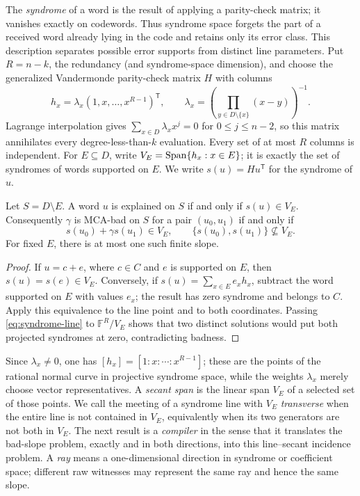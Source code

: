 \documentclass[11pt,a4paper]{amsart}
\numberwithin{equation}{section}
\theoremstyle{remark}
\newcommand{\F}{\mathbb F}\newcommand{\B}{\mathbb B}\newcommand{\K}{\mathbb K}\newcommand{\Z}{\mathbb Z}
\begin{document}
The \emph{syndrome} of a word is the result of applying a parity-check
matrix; it vanishes exactly on codewords.  Thus syndrome space forgets the
part of a received word already lying in the code and retains only its error
class.  This description separates possible error supports from distinct
line parameters.  Put \(R=n-k\), the redundancy (and syndrome-space
dimension), and choose the generalized Vandermonde parity-check matrix
\(H\) with columns
\begin{equation}
 h_x=\lambda_x(1,x,\ldots,x^{R-1})^{\mathsf T},\qquad
 \lambda_x=\left(\prod_{y\in D\setminus\{x\}}(x-y)\right)^{-1}.\label{eq:parity-columns}
\end{equation}
Lagrange interpolation gives
\(\sum_{x\in D}\lambda_xx^j=0\) for \(0\le j\le n-2\), so this matrix
annihilates every degree-less-than-\(k\) evaluation.  Every set of at most
\(R\) columns is independent.  For \(E\subseteq D\), write
\(V_E=\operatorname{Span}\{h_x:x\in E\}\); it is exactly the set of syndromes of words
supported on \(E\).  We write \(s(u)=Hu^{\mathsf T}\) for the syndrome of
\(u\).

\begin{proposition}
\label{prop:syndrome-line-normal-form}
Let \(S=D\setminus E\).  A word \(u\) is explained on \(S\) if and only if
\(s(u)\in V_E\).  Consequently \(\gamma\) is MCA-bad on \(S\) for a pair
\((u_0,u_1)\) if and only if
\begin{equation}
 s(u_0)+\gamma s(u_1)\in V_E,
 \qquad
 \{s(u_0),s(u_1)\}\not\subseteq V_E.\label{eq:syndrome-line}
\end{equation}
For fixed \(E\), there is at most one such finite slope.
\end{proposition}

\begin{proof}
If \(u=c+e\), where \(c\in C\) and \(e\) is supported on \(E\), then
\(s(u)=s(e)\in V_E\).  Conversely, if
\(s(u)=\sum_{x\in E}e_xh_x\), subtract the word supported on \(E\) with
values \(e_x\); the result has zero syndrome and belongs to \(C\).  Apply
this equivalence to the line point and to both coordinates.  Passing
\eqref{eq:syndrome-line} to \(\F^R/V_E\) shows that two distinct solutions
would put both projected syndromes at zero, contradicting badness.
\end{proof}

Since \(\lambda_x\ne0\), one has
\([h_x]=[1:x:\cdots:x^{R-1}]\); these are the points of the rational
normal curve in projective syndrome space, while the weights
\(\lambda_x\) merely choose vector representatives.  A \emph{secant span} is the linear span
\(V_E\) of a selected set of those points.  We call the meeting of a
syndrome line with \(V_E\) \emph{transverse} when the entire line is not
contained in \(V_E\), equivalently when its two generators are not both in
\(V_E\).  The next result is a \emph{compiler} in the sense that it
translates the bad-slope problem, exactly and in both directions, into this
line--secant incidence problem.  A \emph{ray} means a one-dimensional
direction in syndrome or coefficient space; different raw witnesses may
represent the same ray and hence the same slope.
\end{document}
